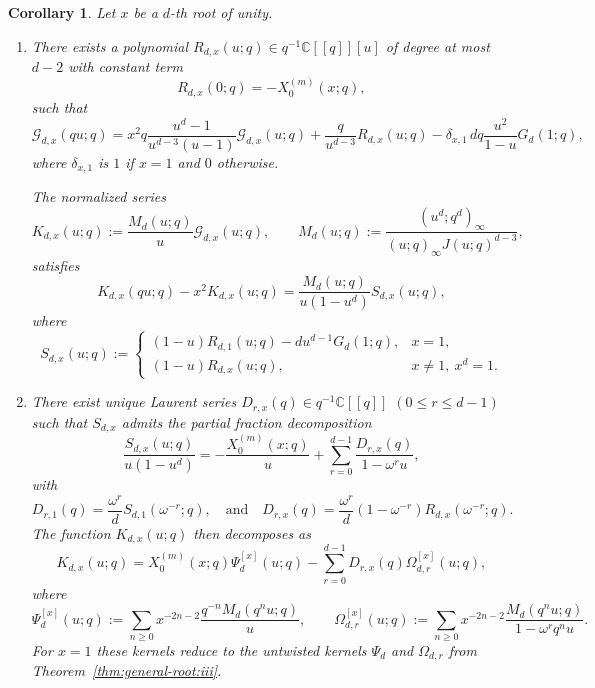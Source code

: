 \documentclass[12pt]{amsart}
\numberwithin{equation}{section}
\newtheorem{corollary}[theorem]{Corollary}
\newcommand{\CC}{\mathbb C}
\begin{document}
\begin{corollary}\label{cor:torsion-slice}
Let $x$ be a $d$-th root of unity.

\begin{enumerate}[label=\textnormal{(\roman*)}]
\item There exists a polynomial $R_{d,x}(u;q)\in q^{-1}\CC[[q]][u]$ of degree at most $d-2$ with constant term
\[
R_{d,x}(0;q)=-X_0^{(m)}(x;q),
\]
such that
\[
\mathcal G_{d,x}(qu;q)
=
x^2q\frac{u^d-1}{u^{d-3}(u-1)}\mathcal G_{d,x}(u;q)
+
\frac{q}{u^{d-3}}R_{d,x}(u;q)
-
\delta_{x,1}\,d q\frac{u^2}{1-u}G_d(1;q),
\]
where $\delta_{x,1}$ is $1$ if $x=1$ and $0$ otherwise.

The normalized series 
\[
K_{d,x}(u;q):=\frac{M_d(u;q)}{u}\mathcal G_{d,x}(u;q),\qquad M_d(u;q):=\frac{(u^d;q^d)_\infty}{(u;q)_\infty J(u;q)^{d-3}},
\]
satisfies
\begin{equation}\label{eq:defect-torsion-slice}
K_{d,x}(qu;q)-x^2K_{d,x}(u;q)
=
\frac{M_d(u;q)}{u(1-u^d)}S_{d,x}(u;q),
\end{equation}
where
\[
S_{d,x}(u;q):=
\begin{cases}
(1-u)R_{d,1}(u;q)-du^{d-1}G_d(1;q), & x=1,\\[4pt]
(1-u)R_{d,x}(u;q), & x\neq 1,\ x^d=1.
\end{cases}
\]

\item There exist unique Laurent series $D_{r,x}(q)\in q^{-1}\CC[[q]]$ $(0\leq r\leq d-1)$ such that $S_{d,x}$ admits the partial fraction decomposition
\[
\frac{S_{d,x}(u;q)}{u(1-u^d)}
=
-\frac{X_0^{(m)}(x;q)}{u}
+
\sum_{r=0}^{d-1}\frac{D_{r,x}(q)}{1-\omega^r u},
\]
with
\[
D_{r,1}(q)=\frac{\omega^r}{d}S_{d,1}(\omega^{-r};q),\quad \text{and} \quad 
D_{r,x}(q)=\frac{\omega^r}{d}(1-\omega^{-r})R_{d,x}(\omega^{-r};q).
\]
The function $K_{d,x}(u;q)$ then decomposes as
\begin{equation}\label{eq:Kd-torsion-slice}
K_{d,x}(u;q)
=
X_0^{(m)}(x;q)\Psi_d^{[x]}(u;q)-\sum_{r=0}^{d-1}D_{r,x}(q)\Omega_{d,r}^{[x]}(u;q),
\end{equation}
where
\[
\Psi_d^{[x]}(u;q):=\sum_{n\geq 0}x^{-2n-2}\frac{q^{-n}M_d(q^nu;q)}{u},
\qquad
\Omega_{d,r}^{[x]}(u;q):=\sum_{n\geq 0}x^{-2n-2}\frac{M_d(q^nu;q)}{1-\omega^rq^nu}.
\]
For $x=1$ these kernels reduce to the untwisted kernels $\Psi_d$ and $\Omega_{d,r}$ from Theorem~\ref{thm:general-root:iii}.


\end{enumerate}
\end{corollary}
\end{document}
